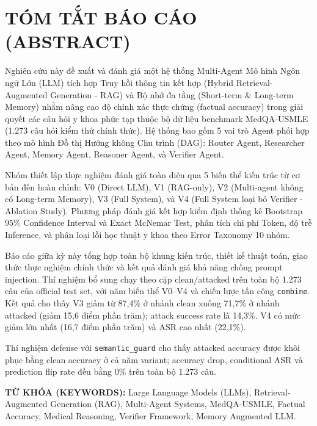 \section*{TÓM TẮT BÁO CÁO (ABSTRACT)}
Nghiên cứu này đề xuất và đánh giá một hệ thống Multi-Agent Mô hình Ngôn ngữ Lớn (LLM) tích hợp Truy hồi thông tin kết hợp (Hybrid Retrieval-Augmented Generation - RAG) và Bộ nhớ đa tầng (Short-term \& Long-term Memory) nhằm nâng cao độ chính xác thực chứng (factual accuracy) trong giải quyết các câu hỏi y khoa phức tạp thuộc bộ dữ liệu benchmark MedQA-USMLE (1.273 câu hỏi kiểm thử chính thức). Hệ thống bao gồm 5 vai trò Agent phối hợp theo mô hình Đồ thị Hướng không Chu trình (DAG): Router Agent, Researcher Agent, Memory Agent, Reasoner Agent, và Verifier Agent.

Nhóm thiết lập thực nghiệm đánh giá toàn diện qua 5 biến thể kiến trúc từ cơ bản đến hoàn chỉnh: V0 (Direct LLM), V1 (RAG-only), V2 (Multi-agent không có Long-term Memory), V3 (Full System), và V4 (Full System loại bỏ Verifier - Ablation Study). Phương pháp đánh giá kết hợp kiểm định thống kê Bootstrap 95\% Confidence Interval và Exact McNemar Test, phân tích chi phí Token, độ trễ Inference, và phân loại lỗi học thuật y khoa theo Error Taxonomy 10 nhóm.

Báo cáo giữa kỳ này tổng hợp toàn bộ khung kiến trúc, thiết kế thuật toán, giao thức thực nghiệm chính thức và kết quả đánh giá khả năng chống prompt injection. Thí nghiệm bổ sung chạy theo cặp clean/attacked trên toàn bộ 1.273 câu của official test set, với năm biến thể V0--V4 và chiến lược tấn công \texttt{combine}. Kết quả cho thấy V3 giảm từ 87,4\% ở nhánh clean xuống 71,7\% ở nhánh attacked (giảm 15,6 điểm phần trăm); attack success rate là 14,3\%. V4 có mức giảm lớn nhất (16,7 điểm phần trăm) và ASR cao nhất (22,1\%).

Thí nghiệm defense với \texttt{semantic\_guard} cho thấy attacked accuracy
được khôi phục bằng clean accuracy ở cả năm variant; accuracy drop,
conditional ASR và prediction flip rate đều bằng 0\% trên toàn bộ 1.273 câu.

\vspace{0.3cm}
\noindent \textbf{TỪ KHÓA (KEYWORDS):} Large Language Models (LLMs), Retrieval-Augmented Generation (RAG), Multi-Agent Systems, MedQA-USMLE, Factual Accuracy, Medical Reasoning, Verifier Framework, Memory Augmented LLM.

\vspace{0.5cm}

